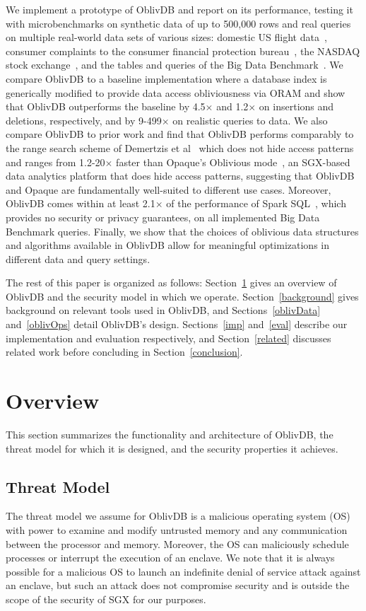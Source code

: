 \documentclass[letterpaper,twocolumn,10pt]{article}
\def\name/{OblivDB}
\begin{document}
We implement a prototype of \name/ and report on its performance, testing it with microbenchmarks on synthetic data of up to 500,000 rows and real queries on multiple real-world data sets of various sizes: domestic US flight data~\cite{FLIGHT}, consumer complaints to the consumer financial protection bureau~\cite{CFPB}, the NASDAQ stock exchange~\cite{NASDAQ}, and the tables and queries of the Big Data Benchmark~\cite{BDB}. We compare \name/ to a baseline implementation where a database index is generically modified to provide data access obliviousness via ORAM and show that \name/ outperforms the baseline by 4.5$\times$ and 1.2$\times$ on insertions and deletions, respectively, and by 9-499$\times$ on realistic queries to data. We also compare \name/ to prior work and find that \name/ performs comparably to the range search scheme of Demertzis et al~\cite{DPP+16} which does not hide access patterns and ranges from 1.2-20$\times$ faster than Opaque's Oblivious mode~\cite{ZDB+17}, an SGX-based data analytics platform that does hide access patterns, suggesting that \name/ and Opaque are fundamentally well-suited to different use cases. Moreover, \name/ comes within at least 2.1$\times$ of the performance of Spark SQL~\cite{SparkSQL}, which provides no security or privacy guarantees, on all implemented Big Data Benchmark queries. Finally, we show that the choices of oblivious data structures and algorithms available in \name/ allow for meaningful optimizations in different data and query settings. 

The rest of this paper is organized as follows: Section~\ref{model} gives an overview of \name/ and the security model in which we operate. Section~\ref{background} gives background on relevant tools used in \name/, and Sections~\ref{oblivData} and~\ref{oblivOps} detail \name/'s design. Sections~\ref{imp} and~\ref{eval} describe our implementation and evaluation respectively, and Section~\ref{related} discusses related work before concluding in Section~\ref{conclusion}. 

\section{Overview}\label{model}
This section summarizes the functionality and architecture of \name/, the threat model for which it is designed, and the security properties it achieves. 

\subsection{Threat Model}
The threat model we assume for \name/ is a malicious operating system (OS) with power to examine and modify untrusted memory and any communication between the processor and memory. Moreover, the OS can maliciously schedule processes or interrupt the execution of an enclave. We note that it is always possible for a malicious OS to launch an indefinite denial of service attack against an enclave, but such an attack does not compromise security and is outside the scope of the security of SGX for our purposes. 
\end{document}
